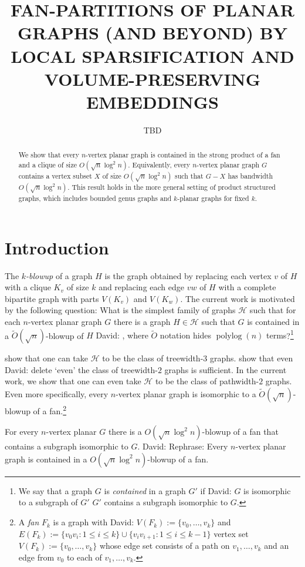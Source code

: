 \documentclass{patmorin}
\title{\MakeUppercase{Fan-Partitions of Planar Graphs (and Beyond)
  \newline by Local Sparsification and Volume-Preserving Embeddings}}
\author{TBD}
\date{}
\renewcommand{\leq}{\leqslant}
\newcommand{\david}[1]{{\color{orange} David: #1}}
\newcommand{\defin}[1]{\emph{\textcolor{brightmaroon}{#1}}}
\DeclareMathOperator{\polylog}{polylog}
\begin{document}
\maketitle

\begin{abstract}
  We show that every $n$-vertex planar graph is contained in the strong product of a fan and a clique of size $O(\sqrt{n}\log^2 n)$.  Equivalently, every $n$-vertex planar graph $G$ contains a vertex subset $X$ of size $O(\sqrt{n}\log^2 n)$ such that $G-X$ has bandwidth $O(\sqrt{n}\log^2 n)$.  This result holds in the more general setting of product structured graphs, which includes bounded genus graphs and $k$-planar graphs for fixed $k$.
\end{abstract}

\section{Introduction}


The \defin{$k$-blowup} of a graph $H$ is the graph obtained by replacing each vertex $v$ of $H$ with a clique $K_v$ of size $k$ and replacing each edge $vw$ of $H$ with a complete bipartite graph with parts $V(K_v)$ and $V(K_w)$.  The current work is motivated by the following question: What is the simplest family of graphs $\mathcal{H}$ such that for each $n$-vertex planar graph $G$ there is a graph $H\in\mathcal{H}$ such that $G$ is contained in a $\tilde{O}(\sqrt{n})$-blowup of $H$\david{, where $\tilde{O}$ notation hides $\polylog(n)$ terms}?\footnote{We say that a graph $G$ is \defin{contained} in a graph $G'$ if \david{$G$ is isomorphic to a subgraph of $G'$} $G'$ contains a subgraph isomorphic to $G$.}

\citet{ISW} show that one can take $\mathcal{H}$ to be the class of treewidth-$3$ graphs. \citet{distel.dujmovic.ea:product} show that even \david{delete `even'} the class of treewidth-$2$ graphs is sufficient.  In the current work, we show that one can even take $\mathcal{H}$ to be the class of pathwidth-$2$ graphs.  Even more specifically, every $n$-vertex planar graph is isomorphic to a $\tilde{O}(\sqrt{n})$-blowup of a fan.\footnote{A \defin{fan} $F_k$ is a graph with \david{$V(F_k):=\{v_0,\ldots,v_k\}$ and $E(F_k):=\{v_0v_i:1\leq i\leq k\}\cup\{v_iv_{i+1}:1\leq i\leq k-1\}$} vertex set $V(F_k):=\{v_0,\ldots,v_k\}$ whose edge set consists of a path on $v_1,\ldots,v_k$ and an edge from $v_0$ to each of $v_1,\ldots,v_k$.}

\begin{thm}\label{main_thm_planar}
  For every $n$-vertex planar $G$ there is a $O(\sqrt{n}\log^2 n)$-blowup of a fan that contains a subgraph isomorphic to $G$.
\david{Rephrase: Every $n$-vertex planar graph is contained in a $O(\sqrt{n}\log^2 n)$-blowup of a fan.}
\end{thm}
\end{document}
